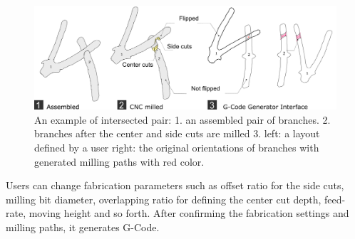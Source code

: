 \begin{figure}[ht]
  \begin{center}
    \includegraphics[width = 0.4\paperwidth]{images/system/joint_milling_diagram_4.png}
    \caption{An example of intersected pair: 1. an assembled pair of branches. 2. branches after the center and side cuts are milled 3. left: a layout defined by a user right: the original orientations of branches with generated milling paths with red color.  }
    \label{fig:joint_geometry}
  \end{center}
\end{figure}

Users can change fabrication parameters such as offset ratio for the side cuts, milling bit diameter, overlapping ratio for defining the center cut depth, feed-rate, moving height and so forth.
After confirming the fabrication settings and milling paths, it generates G-Code.
